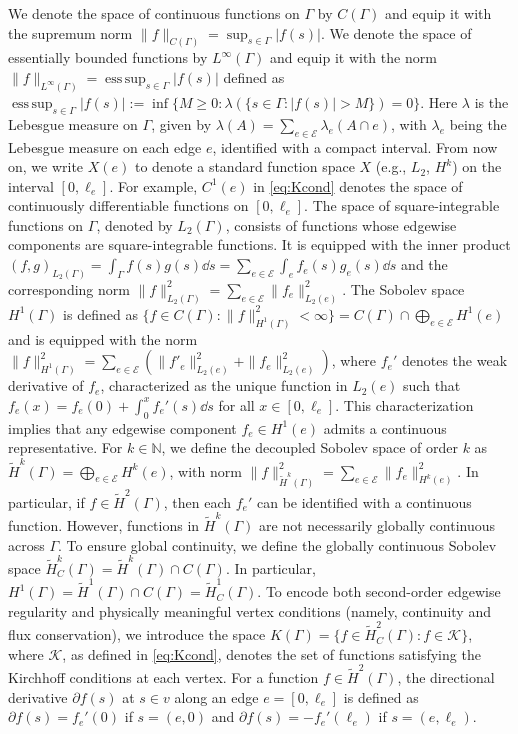 \documentclass[numbers,webpdf]{ima-authoring-template}%
\theoremstyle{thmstyletwo}%
\numberwithin{equation}{section}
\DeclareMathOperator*{\esssup}{ess\,sup}
\begin{document}
We denote the space of continuous functions on $\Gamma$ by $C(\Gamma)$ and equip it with the supremum norm $\|f\|_{C(\Gamma)} = \sup_{s \in \Gamma} |f(s)| $. We denote the space of essentially bounded functions by $L^\infty(\Gamma)$ and equip it with the norm $\|f\|_{L^\infty(\Gamma)} = \esssup_{s \in \Gamma} |f(s)|$ defined as $\esssup_{s \in \Gamma} |f(s)| := \inf \{ M \geq 0 : \lambda(\{s \in \Gamma : |f(s)| > M\}) = 0 \}$. Here $ \lambda $ is the Lebesgue measure on $ \Gamma $, given by $ \lambda(A) = \sum_{e \in \mathcal{E}} \lambda_e(A \cap e) $, with $ \lambda_e $ being the Lebesgue measure on each edge $ e $, identified with a compact interval. From now on, we write $X(e)$ to denote a standard function space $X$ (e.g., $L_2$, $H^k$) on the interval $[0,\ell_e]$. For example, $C^1(e)$ in \eqref{eq:Kcond} denotes the space of continuously differentiable functions on $[0,\ell_e]$. The space of square-integrable functions on $\Gamma$, denoted by $L_2(\Gamma)$, consists of functions whose edgewise components are square-integrable functions. It is equipped with the inner product  $(f,g)_{L_2(\Gamma)} = \int_\Gamma f(s)g(s)\dd s = \sum_{e\in\mathcal{E}}\int_{e}f_{e}(s)g_{e}(s)\dd s$ and the corresponding norm $\|f\|^2_{L_2(\Gamma)} = \sum_{e\in\mathcal{E}}\|f_{e}\|^2_{L_2(e)}$. The Sobolev space $ H^1(\Gamma) $ is defined as $ \{f \in C(\Gamma) : \|f\|^2_{H^1(\Gamma)} < \infty \} = C(\Gamma) \cap \bigoplus_{e \in \mathcal{E}} H^1(e)$ and is equipped with the norm $\|f\|^2_{H^1(\Gamma)} = \sum_{e \in \mathcal{E}} (\|f'_{e}\|^2_{L_2(e)}+\|f_{e}\|^2_{L_2(e)})$, where $f_{e}'$ denotes the weak derivative of $ f_{e} $, characterized as the unique function in $L_2(e)$ such that  $f_e(x) = f_e(0) + \int_0^x f_e'(s)\dd s$ for all $x \in [0, \ell_{e}]$. This characterization implies that any edgewise component $ f_e \in H^1(e) $  admits a continuous representative. For $k\in\mathbb{N}$, we define the decoupled Sobolev space of order $k$ as  $\widetilde{H}^k(\Gamma) = \bigoplus_{e \in \mathcal{E}} H^k(e)$, with norm $\|f\|^2_{\widetilde{H}^k(\Gamma)} = \sum_{e \in \mathcal{E}} \|f_{e}\|^2_{H^k(e)}$. In particular, if $ f \in \widetilde{H}^2(\Gamma) $, then each $ f_e' $ can be identified with a continuous function.  However, functions in $\widetilde{H}^k(\Gamma)$ are not necessarily globally continuous across $\Gamma$. To ensure global continuity, we define the globally continuous Sobolev space $\widetilde{H}_C^k(\Gamma) = \widetilde{H}^k(\Gamma) \cap C(\Gamma)$. In particular, $ H^1(\Gamma) = \widetilde{H}^1(\Gamma) \cap C(\Gamma) = \widetilde{H}_C^1(\Gamma) $. To encode both second-order edgewise regularity and physically meaningful vertex conditions (namely, continuity and flux conservation), we introduce the space  $K(\Gamma) = \{f \in \widetilde{H}^2_C(\Gamma) : f\in \mathcal{K}\}$, where $\mathcal{K}$, as defined in \eqref{eq:Kcond}, denotes the set of functions satisfying the Kirchhoff conditions at each vertex. For a function $f\in\widetilde{H}^2(\Gamma)$, the directional derivative $ \partial f(s)$ at $s\in v$ along an edge $ e =[0,\ell_e]$ is defined as $ \partial f(s) = f_e'(0) $ if $ s=(e,0) $ and $ \partial f(s) = -f_e'(\ell_e) $ if $ s=(e, \ell_e) $. %
\end{document}
